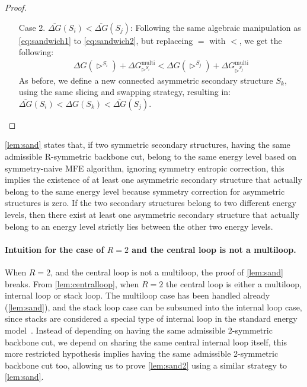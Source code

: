 \documentclass[11pt,letterpaper]{article}  \usepackage[margin=1in]{geometry}
\theoremstyle{definition}  \newtheorem{Definition}[theorem]{Definition}
\newcommand{\symnMFE}{symmetry-naive MFE\xspace}
\newcommand{\DGnosym}{\ensuremath{\overline{\Delta G}}}
\begin{document}
\begin{proof}
\begin{enumerate}
		\item[Case 2.]  $\DGnosym(S_i) < \DGnosym(S_j)$:  Following the same algebraic manipulation as \cref{eq:sandwich1} to \cref{eq:sandwich2}, but replaceing $=$ with $<$, we get the following:
		\begin{gather*}
			\Delta G(\rhd^{S_i}) + \Delta G_{\rhd^{S_i}}^\textrm{multi}  < \Delta G(\rhd^{S_j}) + \Delta G_{\rhd^{S_j}}^\textrm{multi}
		\end{gather*}
		As before, we define a new connected asymmetric secondary structure $S_k$, using the same slicing and swapping strategy, resulting in: $\DGnosym(S_i) < \Delta G(S_k) < \DGnosym(S_j)$. 
	\end{enumerate}
\end{proof}

\cref{lem:sand} states that, if two symmetric secondary structures, having the same admissible R-symmetric backbone cut, belong to the same energy level based on \symnMFE algorithm, ignoring symmetry entropic correction, this implies the existence of at least one asymmetric secondary structure that actually belong to the same energy level because symmetry  correction for asymmetric structures is zero. If the two secondary structures belong to two different energy levels, then there exist at least one asymmetric secondary structure that actually belong to an energy level strictly lies between the other two energy levels.


\paragraph{Intuition for the case of $R=2$ and the central loop is not a multiloop.} 
When $R=2$, and the central loop is not a multiloop, the proof of \cref{lem:sand} breaks.   
From \cref{lem:centralloop}, when $R=2$ the central loop is either a multiloop, internal loop or stack loop. 
The multiloop case has been handled already (\cref{lem:sand}), and the stack loop case can be subsumed into the  internal loop case, since stacks are considered a special type of internal loop in the standard energy model~\cite{dirks2007thermodynamic}. 
Instead of depending on having the same admissible 2-symmetric backbone cut, we depend on sharing the same central internal loop itself, this more restricted hypothesis   implies having the same admissible 2-symmetric backbone cut too, allowing us to prove \cref{lem:sand2} using a similar strategy to  \cref{lem:sand}.  
\end{document}
